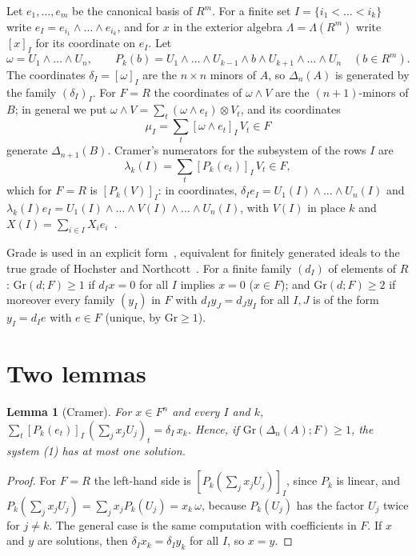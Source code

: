 \documentclass[11pt]{amsart}
\newtheorem{lemma}[theorem]{Lemma}
\theoremstyle{definition}
\theoremstyle{remark}
\newcommand{\Gr}{\mathrm{Gr}}
\newcommand{\co}[2]{[#1]_{#2}}
\begin{document}
Let $e_1,\dots,e_m$ be the canonical basis of $R^m$.  For a finite set
$I=\{i_1<\dots<i_k\}$ write $e_I=e_{i_1}\wedge\dots\wedge e_{i_k}$, and for
$x$ in the exterior algebra $\Lambda=\Lambda(R^m)$ write
$\co xI$ for its coordinate on $e_I$.  Let
\[
  \omega=U_1\wedge\dots\wedge U_n,\qquad
  P_k(b)=U_1\wedge\dots\wedge U_{k-1}\wedge b\wedge U_{k+1}\wedge\dots\wedge U_n
  \quad(b\in R^m).
\]
The coordinates $\delta_I=\co\omega I$ are the $n\times n$ minors of $A$, so
$\Delta_n(A)$ is generated by the family $(\delta_I)_I$.  For $F=R$ the
coordinates of $\omega\wedge V$ are the $(n+1)$-minors of $B$; in general we
put $\omega\wedge V=\sum_t(\omega\wedge e_t)\otimes V_t$, and its
coordinates
\[
  \textstyle\mu_I=\sum_t\co{\omega\wedge e_t}I\,V_t\in F
\]
generate $\Delta_{n+1}(B)$.  Cramer's numerators for the subsystem of the
rows $I$ are
\[
  \textstyle\lambda_k(I)=\sum_t\co{P_k(e_t)}I\,V_t\in F,
\]
which for $F=R$ is $\co{P_k(V)}I$: in coordinates,
$\delta_Ie_I=U_1(I)\wedge\dots\wedge U_n(I)$ and
$\lambda_k(I)e_I=U_1(I)\wedge\dots\wedge V(I)\wedge\dots\wedge U_n(I)$,
with $V(I)$ in place $k$ and $X(I)=\sum_{i\in I}X_ie_i$~\cite{Co10}.

Grade is used in an explicit form~\cite{CL,CQ}, equivalent for finitely
generated ideals to the true grade of Hochster and
Northcott~\cite{Northcott}.  For a finite family $(d_I)$ of elements of $R$:
$\Gr(d;F)\geq1$ if $d_Ix=0$ for all $I$ implies $x=0$ ($x\in F$); and
$\Gr(d;F)\geq2$ if moreover every family $(y_I)$ in $F$ with
$d_Iy_J=d_Jy_I$ for all $I,J$ is of the form $y_I=d_Ie$ with $e\in F$
(unique, by $\Gr\geq1$).

\section{Two lemmas}

\begin{lemma}[Cramer]\label{lem:cramer}
For $x\in F^n$ and every $I$ and $k$,
$\sum_t\co{P_k(e_t)}I\,(\textstyle\sum_jx_jU_j)_t=\delta_I\,x_k$.  Hence, if
$\Gr(\Delta_n(A);F)\geq1$, the system (1) has at most one solution.
\end{lemma}

\begin{proof}
For $F=R$ the left-hand side is $\co{P_k(\sum_jx_jU_j)}I$, since $P_k$ is
linear, and $P_k(\sum_jx_jU_j)=\sum_jx_jP_k(U_j)=x_k\,\omega$, because
$P_k(U_j)$ has the factor $U_j$ twice for $j\neq k$.  The general case is
the same computation with coefficients in $F$.  If $x$ and $y$ are
solutions, then $\delta_Ix_k=\delta_Iy_k$ for all $I$, so $x=y$.
\end{proof}
\end{document}
